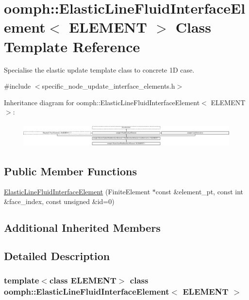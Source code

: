 \hypertarget{classoomph_1_1ElasticLineFluidInterfaceElement}{}\section{oomph\+:\+:Elastic\+Line\+Fluid\+Interface\+Element$<$ E\+L\+E\+M\+E\+NT $>$ Class Template Reference}
\label{classoomph_1_1ElasticLineFluidInterfaceElement}


Specialise the elastic update template class to concrete 1D case.  




{\ttfamily \#include $<$specific\+\_\+node\+\_\+update\+\_\+interface\+\_\+elements.\+h$>$}

Inheritance diagram for oomph\+:\+:Elastic\+Line\+Fluid\+Interface\+Element$<$ E\+L\+E\+M\+E\+NT $>$\+:\begin{figure}[H]
\begin{center}
\leavevmode
\includegraphics[height=1.307647cm]{classoomph_1_1ElasticLineFluidInterfaceElement}
\end{center}
\end{figure}
\subsection*{Public Member Functions}
\begin{DoxyCompactItemize}
\item 
\hyperlink{classoomph_1_1ElasticLineFluidInterfaceElement_ab0dde23477404e1c97956e40cfe361ab}{Elastic\+Line\+Fluid\+Interface\+Element} (Finite\+Element $\ast$const \&element\+\_\+pt, const int \&face\+\_\+index, const unsigned \&id=0)
\end{DoxyCompactItemize}
\subsection*{Additional Inherited Members}


\subsection{Detailed Description}
\subsubsection*{template$<$class E\+L\+E\+M\+E\+NT$>$\newline
class oomph\+::\+Elastic\+Line\+Fluid\+Interface\+Element$<$ E\+L\+E\+M\+E\+N\+T $>$}

